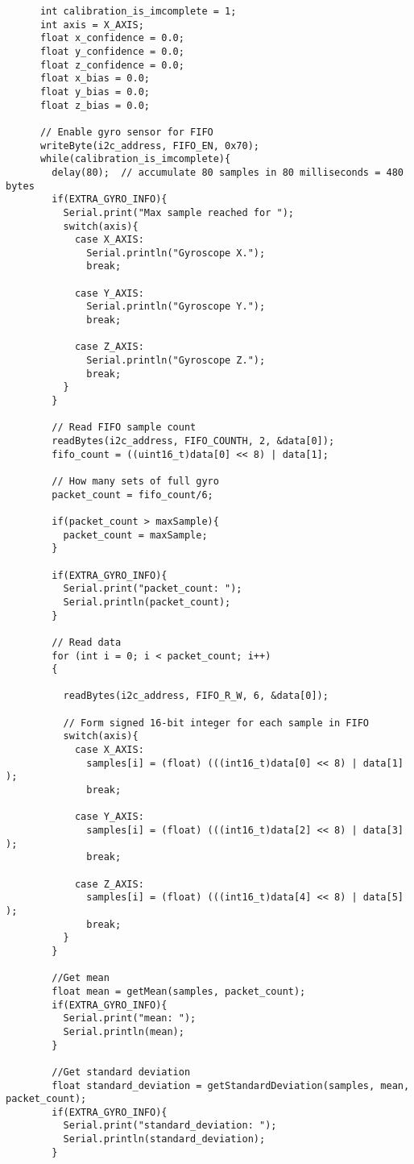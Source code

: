 \begin{lstlisting}
	  int calibration_is_imcomplete = 1;
	  int axis = X_AXIS;
	  float x_confidence = 0.0;
	  float y_confidence = 0.0;
	  float z_confidence = 0.0;
	  float x_bias = 0.0;
	  float y_bias = 0.0;
	  float z_bias = 0.0;

	  // Enable gyro sensor for FIFO
	  writeByte(i2c_address, FIFO_EN, 0x70);
	  while(calibration_is_imcomplete){
	    delay(80);  // accumulate 80 samples in 80 milliseconds = 480 bytes
	    if(EXTRA_GYRO_INFO){
	      Serial.print("Max sample reached for ");
	      switch(axis){
	        case X_AXIS:
	          Serial.println("Gyroscope X.");
	          break;

	        case Y_AXIS:
	          Serial.println("Gyroscope Y.");
	          break;

	        case Z_AXIS:
	          Serial.println("Gyroscope Z.");
	          break;
	      }
	    }

	    // Read FIFO sample count
	    readBytes(i2c_address, FIFO_COUNTH, 2, &data[0]);
	    fifo_count = ((uint16_t)data[0] << 8) | data[1];

	    // How many sets of full gyro
	    packet_count = fifo_count/6;

	    if(packet_count > maxSample){
	      packet_count = maxSample;
	    }

	    if(EXTRA_GYRO_INFO){
	      Serial.print("packet_count: ");
	      Serial.println(packet_count);
	    }

	    // Read data
	    for (int i = 0; i < packet_count; i++)
	    {

	      readBytes(i2c_address, FIFO_R_W, 6, &data[0]);

	      // Form signed 16-bit integer for each sample in FIFO
	      switch(axis){
	        case X_AXIS:
	          samples[i] = (float) (((int16_t)data[0] << 8) | data[1]  );
	          break;

	        case Y_AXIS:
	          samples[i] = (float) (((int16_t)data[2] << 8) | data[3]  );
	          break;

	        case Z_AXIS:
	          samples[i] = (float) (((int16_t)data[4] << 8) | data[5]  );
	          break;
	      }
	    }

	    //Get mean
	    float mean = getMean(samples, packet_count);
	    if(EXTRA_GYRO_INFO){
	      Serial.print("mean: ");
	      Serial.println(mean);
	    }

	    //Get standard deviation
	    float standard_deviation = getStandardDeviation(samples, mean, packet_count);
	    if(EXTRA_GYRO_INFO){
	      Serial.print("standard_deviation: ");
	      Serial.println(standard_deviation);
	    }


\end{lstlisting}
